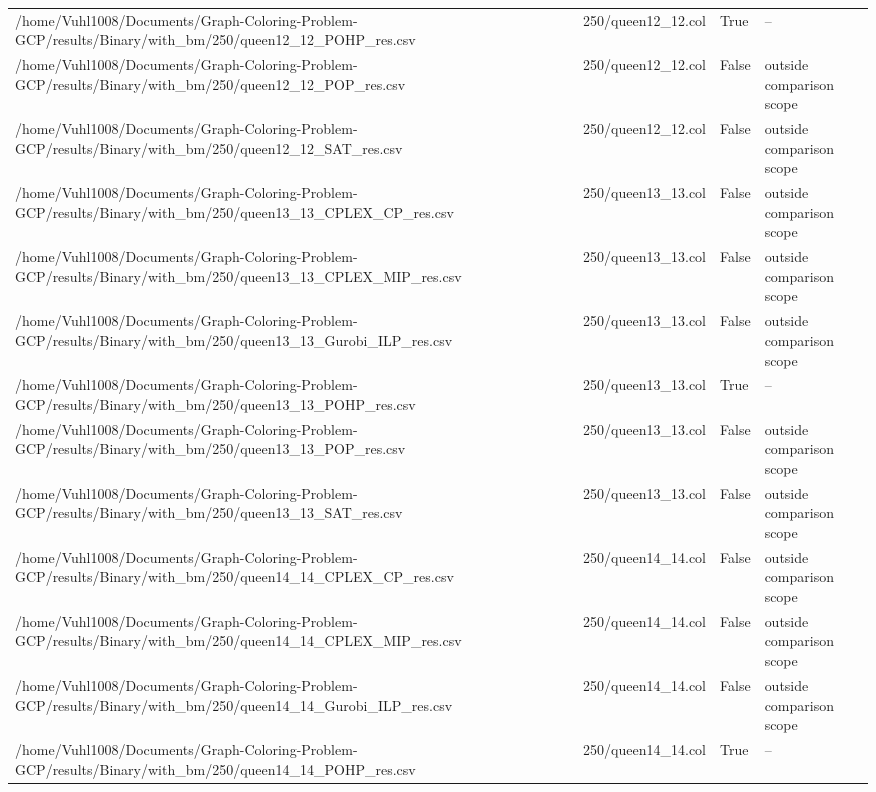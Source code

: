 \begin{table}[htbp]
\begin{tabular}{llll}
/home/Vuhl1008/Documents/Graph-Coloring-Problem-GCP/results/Binary/with\_bm/250/queen12\_12\_POHP\_res.csv & 250/queen12\_12.col & True & -- \\
/home/Vuhl1008/Documents/Graph-Coloring-Problem-GCP/results/Binary/with\_bm/250/queen12\_12\_POP\_res.csv & 250/queen12\_12.col & False & outside comparison scope \\
/home/Vuhl1008/Documents/Graph-Coloring-Problem-GCP/results/Binary/with\_bm/250/queen12\_12\_SAT\_res.csv & 250/queen12\_12.col & False & outside comparison scope \\
/home/Vuhl1008/Documents/Graph-Coloring-Problem-GCP/results/Binary/with\_bm/250/queen13\_13\_CPLEX\_CP\_res.csv & 250/queen13\_13.col & False & outside comparison scope \\
/home/Vuhl1008/Documents/Graph-Coloring-Problem-GCP/results/Binary/with\_bm/250/queen13\_13\_CPLEX\_MIP\_res.csv & 250/queen13\_13.col & False & outside comparison scope \\
/home/Vuhl1008/Documents/Graph-Coloring-Problem-GCP/results/Binary/with\_bm/250/queen13\_13\_Gurobi\_ILP\_res.csv & 250/queen13\_13.col & False & outside comparison scope \\
/home/Vuhl1008/Documents/Graph-Coloring-Problem-GCP/results/Binary/with\_bm/250/queen13\_13\_POHP\_res.csv & 250/queen13\_13.col & True & -- \\
/home/Vuhl1008/Documents/Graph-Coloring-Problem-GCP/results/Binary/with\_bm/250/queen13\_13\_POP\_res.csv & 250/queen13\_13.col & False & outside comparison scope \\
/home/Vuhl1008/Documents/Graph-Coloring-Problem-GCP/results/Binary/with\_bm/250/queen13\_13\_SAT\_res.csv & 250/queen13\_13.col & False & outside comparison scope \\
/home/Vuhl1008/Documents/Graph-Coloring-Problem-GCP/results/Binary/with\_bm/250/queen14\_14\_CPLEX\_CP\_res.csv & 250/queen14\_14.col & False & outside comparison scope \\
/home/Vuhl1008/Documents/Graph-Coloring-Problem-GCP/results/Binary/with\_bm/250/queen14\_14\_CPLEX\_MIP\_res.csv & 250/queen14\_14.col & False & outside comparison scope \\
/home/Vuhl1008/Documents/Graph-Coloring-Problem-GCP/results/Binary/with\_bm/250/queen14\_14\_Gurobi\_ILP\_res.csv & 250/queen14\_14.col & False & outside comparison scope \\
/home/Vuhl1008/Documents/Graph-Coloring-Problem-GCP/results/Binary/with\_bm/250/queen14\_14\_POHP\_res.csv & 250/queen14\_14.col & True & -- \\

\end{tabular}
\end{table}

